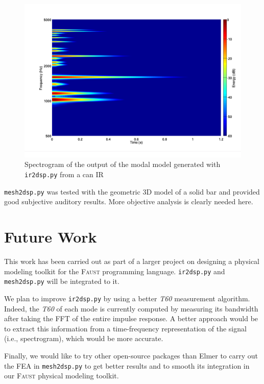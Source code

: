 \documentclass[11pt,a4paper]{article}
\newcommand{\f}{\textsc{Faust}}
\begin{document}
\begin{figure}[htbp]
  \centering
  \includegraphics[width=\columnwidth]{pictures/canModalModel}
  \caption{Spectrogram of the output of the modal model generated with \texttt{ir2dsp.py} from a can IR}
  \label{fig:spectro2}
\end{figure}

\texttt{mesh2dsp.py} was tested with the geometric 3D model of a solid bar and provided good subjective auditory results. More objective analysis is clearly needed here.

\section{Future Work}
\label{sec:future}

This work has been carried out as part of a larger project on designing a physical modeling toolkit for the \f{} programming language. \texttt{ir2dsp.py} and \texttt{mesh2dsp.py} will be integrated to it.

We plan to improve \texttt{ir2dsp.py} by using a better \textit{T60} measurement algorithm. Indeed, the \textit{T60} of each mode is currently computed by measuring its bandwidth after taking the FFT of the entire impulse response. A better approach would be to extract this information from a time-frequency representation of the signal (i.e., spectrogram), which would be more accurate.

Finally, we would like to try other open-source packages than Elmer to carry out the FEA in \texttt{mesh2dsp.py} to get better results and to smooth its integration in our \f{} physical modeling toolkit.
\end{document}
